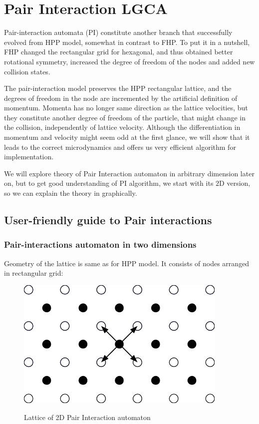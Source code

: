 \chapter{Pair Interaction LGCA}
Pair-interaction automata (PI) constitute another branch that successfully evolved from HPP model, somewhat in contrast to FHP.
To put it in a nutshell, FHP changed the rectangular grid for hexagonal, and thus obtained better rotational symmetry, increased the degree of freedom of the nodes and added new collision states. 

The pair-interaction model preserves the HPP rectangular lattice, and the degrees of freedom in the node are incremented by the artificial definition of momentum.
Momenta has no longer same direction as the lattice velocities, but they constitute another degree of freedom of the particle, that might change in the collision, independently of lattice velocity. 
Although the differentiation in momentum and velocity might seem odd at the first glance, we will show that it leads to the correct microdynamics and offers us very efficient algorithm for implementation.

\bigskip
We will explore theory of Pair Interaction automaton in arbitrary dimension later on, but to get good understanding of PI algorithm, we start with its $2$D version, so we can explain the theory in graphically.

\section{User-friendly guide to Pair interactions}

\subsection{Pair-interactions automaton in two dimensions}

Geometry of the lattice is same as for HPP model. It consists of nodes arranged in rectangular grid:

\begin{figure}[htbp]
 \centering 
 \includegraphics[width=0.9\textwidth]{./img/pi_grid}
 \label{2dgrid}
 \caption{Lattice of 2D Pair Interaction automaton}
\end{figure}

